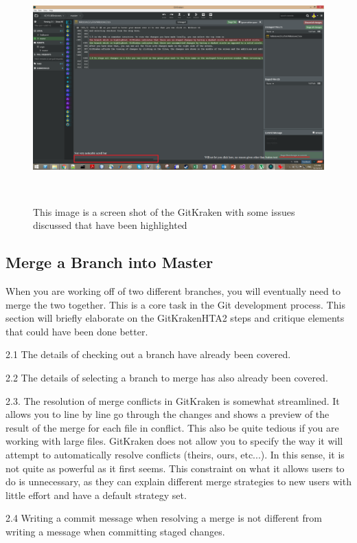 \documentclass{sigchi}
\begin{document}
\begin{figure}
  \centering
  \includegraphics[width=1.75\columnwidth]{figures/GitKraken/Screenshot2Highlighted}
  \caption{This image is a screen shot of the GitKraken with some issues discussed that have been highlighted}~\label{fig:GitKrakenFigure3}
\end{figure}

\subsection{Merge a Branch into Master}
When you are working off of two different branches, you will eventually need to merge the two together.
This is a core task in the Git development process. This section will briefly elaborate on the GitKrakenHTA2 steps and critique elements that could have been done better.

2.1 The details of checking out a branch have already been covered.

2.2 The details of selecting a branch to merge has also already been covered.

2.3. The resolution of merge conflicts in GitKraken is somewhat streamlined. It allows you to line by line go through the changes and shows a preview of the result of the merge for each file in conflict. This also be quite tedious if you are working with large files. GitKraken does not allow you to specify the way it will attempt to automatically resolve conflicts (theirs, ours, etc...). In this sense, it is not quite as powerful as it first seems. This constraint on what it allows users to do is unnecessary, as they can explain different merge strategies to new users with little effort and have a default strategy set.

2.4 Writing a commit message when resolving a merge is not different from writing a message when committing staged changes.
\end{document}
